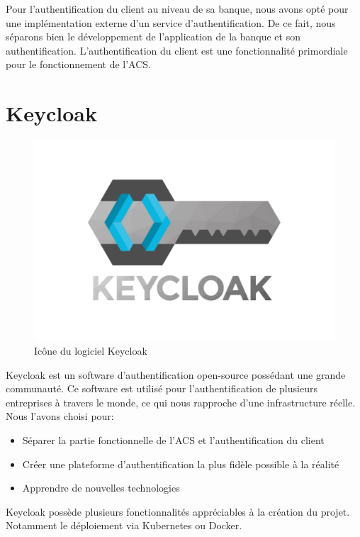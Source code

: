Pour l'authentification du client au niveau de sa banque, nous avons opté pour une implémentation
externe d'un service d'authentification. De ce fait, nous séparons bien le développement de
l'application de la banque et son authentification.
L'authentification du client est une fonctionnalité primordiale pour le fonctionnement de l'ACS.

\section{Keycloak}

\begin{figure}[H]
    \centering
    \includegraphics[scale=.1]{./img/Keycloak.png}
    \caption{Icône du logiciel Keycloak}
    \label{fig:keycloak_logo}
\end{figure}

Keycloak est un software d'authentification open-source
possédant une grande communauté. Ce software est
utilisé pour l'authentification de plusieurs entreprises à
travers le monde, ce qui nous rapproche d'une
infrastructure réelle. Nous l'avons choisi pour:

\begin{itemize}
    \item Séparer la partie fonctionnelle de l'ACS et
    l'authentification du client
    \item Créer une plateforme d'authentification la plus
    fidèle possible à la réalité
    \item Apprendre de nouvelles technologies
\end{itemize}

Keycloak possède plusieurs fonctionnalités appréciables à la création du projet. Notamment le
déploiement via Kubernetes ou Docker.

